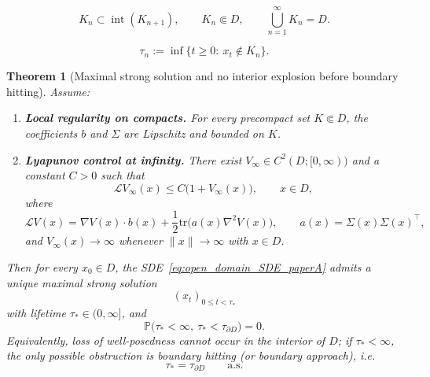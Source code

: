 \documentclass[10pt,a4paper]{amsart}
\newtheorem{theorem}{Theorem}
\begin{document}
\begin{equation}
\label{eq:appC_exhaustion}
K_n\subset \operatorname{int}(K_{n+1}),\qquad K_n\Subset D,\qquad \bigcup_{n=1}^\infty K_n=D.
\end{equation}

\begin{equation}
\label{eq:appC_tau_n}
\tau_n:=\inf\{t\ge 0:\ x_t\notin K_n\}.
\end{equation}

\begin{theorem}[Maximal strong solution and no interior explosion before boundary hitting]
\label{thm:maximal_no_interior_explosion_paperA}
Assume:
\begin{enumerate}[label=(A\arabic*)]
\item \textbf{Local regularity on compacts.} For every precompact set \(K\Subset D\), the coefficients \(b\) and \(\Sigma\) are Lipschitz and bounded on \(K\).
\item \textbf{Lyapunov control at infinity.} There exist \(V_\infty\in C^2(D;[0,\infty))\) and a constant \(C>0\) such that
\begin{equation}
\label{eq:Lyap_infty_cond_paperA}
\mathcal L V_\infty(x)\le C\bigl(1+V_\infty(x)\bigr),\qquad x\in D,
\end{equation}
where
\[
\mathcal L V(x)=\nabla V(x)\cdot b(x)+\frac12\mathrm{tr}\!\bigl(a(x)\nabla^2V(x)\bigr),
\qquad a(x)=\Sigma(x)\Sigma(x)^\top,
\]
and \(V_\infty(x)\to\infty\) whenever \(\|x\|\to\infty\) with \(x\in D\).
\end{enumerate}
Then for every \(x_0\in D\), the SDE~\eqref{eq:open_domain_SDE_paperA} admits a unique maximal strong solution
\[
(x_t)_{0\le t<\tau_*}
\]
with lifetime \(\tau_*\in(0,\infty]\), and
\begin{equation}
\label{eq:no_interior_blowup_paperA}
\mathbb P\bigl(\tau_*<\infty,\ \tau_*<\tau_{\partial D}\bigr)=0.
\end{equation}
Equivalently, loss of well-posedness cannot occur in the interior of \(D\); if \(\tau_*<\infty\), the only possible obstruction is boundary hitting (or boundary approach), i.e.
\begin{equation}
\label{eq:tau_star_equals_boundary_paperA}
\tau_*=\tau_{\partial D}\qquad\text{a.s.}
\end{equation}
\end{theorem}
\end{document}
